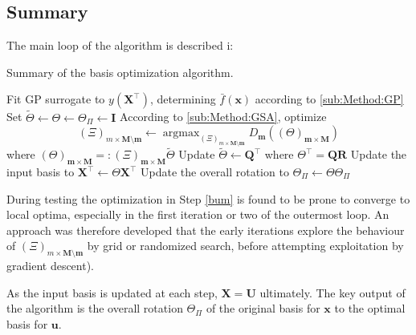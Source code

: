 \documentclass[preprint,12pt]{elsarticle}
\newcommand*{\M}[1]{\ensuremath{#1}\xspace}
\newcommand*{\vr}[1]{\M{\mathbf{#1}}}
\newcommand*{\deqr}{\M{=\mathrel{\mathop:}}}
\DeclareMathOperator*{\argmax}{argmax}
\begin{document}
        \subsection{Summary} \label{sub:Method:Summary}
            The main loop of the algorithm is described i:
            
            \begin{algorithm}
            \caption{Summary of the basis optimization algorithm.}
                \begin{algorithmic}[1]
                    \REPEAT
                        \STATE Fit GP surrogate to $y(\vr{X}^{\intercal})$, determining $\bar{f}(\vr{x})$ according to \cref{sub:Method:GP}
                        \STATE Set $\tilde{\Theta} \leftarrow \Theta \leftarrow \Theta_{\Pi} \leftarrow \vr{I}$
                            \STATE According to \cref{sub:Method:GSA}, optimize \label{bum}
                            $$(\Xi)_{m\times\vr{M}\setminus\vr{m}} \leftarrow \argmax_{(\Xi)_{m\times\vr{M}\setminus\vr{m}}} D_{\vr{m}}((\Theta)_{\vr{m}\times\vr{M}})$$
                            where $(\Theta)_{\vr{m}\times\vr{M}} \deqr (\Xi)_{\vr{m}\times\vr{M}} \tilde{\Theta}$
                            \STATE  Update $\tilde{\Theta} \leftarrow \vr{Q}^{\intercal}$ where $\Theta^{\intercal} = \vr{Q}\vr{R}$
                        \ENDFOR
                        \STATE Update the input basis to $\vr{X}^{\intercal} \leftarrow \Theta \vr{X}^{\intercal}$
                        \STATE Update the overall rotation to $\Theta_{\Pi} \leftarrow \Theta \Theta_{\Pi}$
                    \UNTIL{$\Theta \approx \vr{I}$}
                \end{algorithmic}
            \end{algorithm}

            During testing the optimization in Step \ref{bum} is found to be prone to converge to local optima, especially in the first iteration or two of the outermost loop. An approach was therefore developed that the early iterations explore the behaviour of \M{(\Xi)_{m\times\vr{M}\setminus\vr{m}}} by grid or randomized search, before attempting exploitation by gradient descent).

            As the input basis is updated at each step, \M{\vr{X} = \vr{U}} ultimately. 
            The key output of the algorithm is the overall rotation \M{\Theta_{\Pi}} of the original basis for \vr{x} to the optimal basis for \vr{u}.
            
\end{document}
